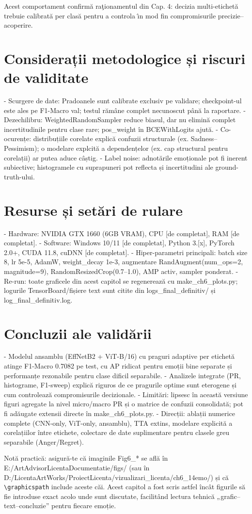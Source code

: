 Acest comportament confirm\u{a} ra\c{t}ionamentul din Cap. 4: decizia multi-etichet\u{a} trebuie calibrat\u{a} per clas\u{a} pentru a controla \^{\i}n mod fin compromisurile precizie--acoperire.

\section{Considerații metodologice și riscuri de validitate}
- Scurgere de date: Pradoanele sunt calibrate exclusiv pe validare; checkpoint-ul este ales pe F1-Macro val; testul rămâne complet necunoscut până la raportare.
- Dezechilibru: WeightedRandomSampler reduce biasul, dar nu elimină complet incertitudinile pentru clase rare; pos\_weight în BCEWithLogits ajută.
- Co-ocurențe: distribuțiile corelate explică confuzii structurale (ex. Sadness–Pessimism); o modelare explcită a dependențelor (ex. cap structural pentru corelații) ar putea aduce câștig.
- Label noise: adnotările emoționale pot fi inerent subiective; histogramele cu suprapuneri pot reflecta și incertitudini ale ground-truth-ului.

\section{Resurse și setări de rulare}
- Hardware: NVIDIA GTX 1660 (6GB VRAM), CPU [de completat], RAM [de completat].
- Software: Windows 10/11 [de completat], Python 3.[x], PyTorch 2.0+, CUDA 11.8, cuDNN [de completat].
- Hiper-parametri principali: batch size 8, lr 5e-5, AdamW, weight\_decay 1e-3, augmentare RandAugment(num\_ops=2, magnitude=9), RandomResizedCrop(0.7–1.0), AMP activ, sampler ponderat.
- Re-run: toate graficele din acest capitol se regenerează cu make\_ch6\_plots.py; logurile TensorBoard/fișiere text sunt citite din logs\_final\_definitiv/ și log\_final\_definitiv.log.

\section{Concluzii ale validării}
- Modelul ansamblu (EffNetB2 + ViT-B/16) cu praguri adaptive per etichetă atinge F1-Macro 0.7082 pe test, cu AP ridicat pentru emoții bine separate și performanțe rezonabile pentru clase dificil separabile.
- Analizele integrate (PR, histograme, F1-sweep) explică riguros de ce pragurile optime sunt eterogene și cum controlează compromisurile decizionale.
- Limitări: lipsesc în această versiune figuri agregate la nivel micro/macro PR și o matrice de confuzii consolidată; pot fi adăugate extensii directe în make\_ch6\_plots.py.
- Direcții: ablații numerice complete (CNN-only, ViT-only, ansamblu), TTA extins, modelare explicită a corelațiilor între etichete, colectare de date suplimentare pentru clasele greu separabile (Anger/Regret).

\bigskip
\noindent Notă practică: asigură-te că imaginile Fig6\_* se află în E:/ArtAdvisorLicentaDocumentatie/figs/ (sau în D:/LicentaArtWorks/ProiectLicenta/vizualizari\_licenta/ch6\_14emo/) și că \verb|\graphicspath| include aceste căi. Acest capitol a fost scris astfel încât figurile să fie introduse exact acolo unde sunt discutate, facilitând lectura tehnică „grafic–text–concluzie” pentru fiecare emoție.

